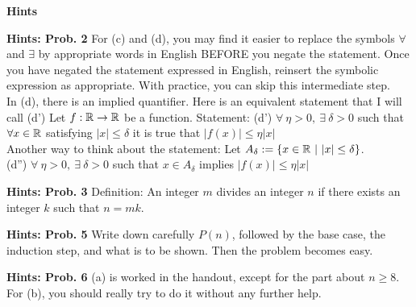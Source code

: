 \documentclass[letterpaper]{article}
\begin{document}
\newpage

\begin{center}
{\bf Hints}
\end{center}

\noindent \textbf{Hints: Prob. 2} For (c) and (d), you may find it easier to replace the symbols $\forall$ and $\exists$ by appropriate words in English BEFORE you negate the statement. Once you have negated the statement expressed in English, reinsert the symbolic expression as appropriate. With practice, you can skip this intermediate step. \\

In (d), there is an implied quantifier.  Here is an equivalent statement that I will call (d') Let $f: \mathbb R \to \mathbb R$ be a function. Statement: (d') $\forall~\eta>0,~\exists~\delta>0$ such that $\forall x\in \mathbb R$ satisfying $|x| \le \delta$ it is true that $|f(x)| \le \eta |x|$ \\

Another way to think about the statement: Let $A_\delta:=\{x\in \mathbb R~| ~ |x|\le \delta \}$.\\

(d'') $\forall~\eta>0,~\exists~\delta>0$ such that $x\in A_\delta$  implies $|f(x)| \le \eta |x|$
\vspace{1cm}

\noindent \textbf{Hints: Prob. 3} Definition: An integer $m$ divides an integer $n$ if there exists an integer $k$ such that $n = m k$.
\vspace{1cm}

\noindent \textbf{Hints: Prob. 5} Write down carefully $P(n)$, followed by the base case, the induction step, and what is to be shown. Then the problem becomes easy.
\vspace{1cm}

\noindent \textbf{Hints: Prob. 6}   (a) is worked in the handout, except for the part about $n\ge 8$. For (b), you should really try to do it without any further help.

\vspace{1cm}
\end{document}
